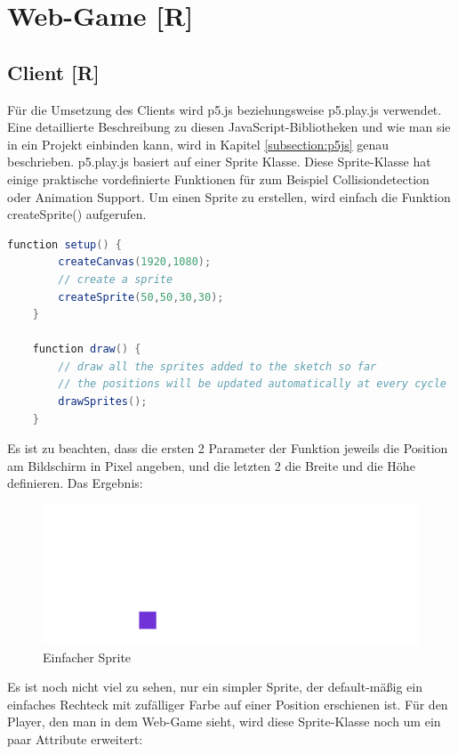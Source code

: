 \section{Web-Game [R]}
\subsection{Client [R]}
Für die Umsetzung des Clients wird p5.js beziehungsweise p5.play.js verwendet. 
Eine detaillierte Beschreibung zu diesen JavaScript-Bibliotheken und wie man sie in ein Projekt einbinden kann, wird in Kapitel \ref{subsection:p5js} genau beschrieben.
p5.play.js basiert auf einer Sprite Klasse. Diese Sprite-Klasse hat einige praktische vordefinierte Funktionen für zum Beispiel Collisiondetection oder Animation Support. 
Um einen Sprite zu erstellen, wird einfach die Funktion createSprite() aufgerufen.
\\
\begin{lstlisting}[language=Java,label=lst:impl:createSprite]
    function setup() {
        createCanvas(1920,1080);
        // create a sprite
        createSprite(50,50,30,30);
    }

    function draw() {
        // draw all the sprites added to the sketch so far
        // the positions will be updated automatically at every cycle
        drawSprites();
    }
\end{lstlisting}


Es ist zu beachten, dass die ersten 2 Parameter der Funktion jeweils die Position am Bildschirm in Pixel angeben, und die letzten 2 die Breite und die Höhe definieren.
Das Ergebnis:
\begin{figure}[H]
    \centering
    \includegraphics[scale=1]{pics/simpleSprite.PNG}
    \caption{Einfacher Sprite}
\end{figure}

Es ist noch nicht viel zu sehen, nur ein simpler Sprite, der default-mäßig ein einfaches Rechteck mit zufälliger Farbe auf einer Position erschienen ist.
Für den Player, den man in dem Web-Game sieht, wird diese Sprite-Klasse noch um ein paar Attribute erweitert:

